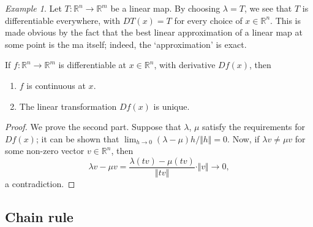 \documentclass[11pt]{article}
\newcommand{\R}{\mathbb{R}}
\newcommand{\norm}[1]{\Vert #1 \Vert}
\theoremstyle{definition}
\theoremstyle{remark}
\newtheorem*{example}{Example}
\numberwithin{equation}{section}
\begin{document}
    \begin{example}
        Let $T\colon \R^n \to \R^m$ be a linear map. By choosing $\lambda = T$, we
        see that $T$ is differentiable everywhere, with $DT(x) = T$ for every choice
        of $x \in \R^n$. This is made obvious by the fact that the best linear
        approximation of a linear map at some point is the ma itself; indeed, the
        `approximation' is exact.
    \end{example}

    \begin{lemma}
        If $f\colon \R^n \to \R^m$ is differentiable at $x \in \R^n$, with derivative
        $Df(x)$, then
        \begin{enumerate}
            \itemsep0em
            \item $f$ is continuous at $x$.
            \item The linear transformation $Df(x)$ is unique.
        \end{enumerate}
    \end{lemma}
    \begin{proof}
        We prove the second part. Suppose that $\lambda$, $\mu$ satisfy the
        requirements for $Df(x)$; it can be shown that $\lim_{h \to 0} (\lambda -
        \mu)h / \norm{h} = 0$. Now, if $\lambda v \neq \mu v$ for some non-zero
        vector $v \in \R^n$, then \[
            \lambda v - \mu v = \frac{\lambda(tv) - \mu(tv)}{\norm{tv}} \cdot
            \norm{v} \to 0,
        \] a contradiction.
    \end{proof}

    \subsection{Chain rule}
\end{document}
